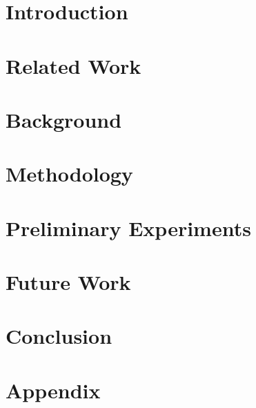 \documentclass[fleqn]{article}
\begin{document}
\begin{multicols}{2}
\section{Introduction}



\section{Related Work}



\section{Background}



\section{Methodology}



\section{Preliminary Experiments}



\section{Future Work}



\section{Conclusion}


%
%



\end{multicols}
\pagebreak

\section{Appendix}


\end{document}
